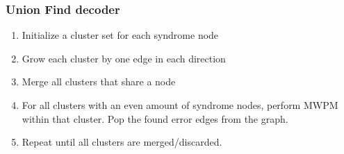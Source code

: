 \subsubsection{Union Find decoder}
\begin{enumerate}
    \item Initialize a cluster set for each syndrome node
    \item Grow each cluster by one edge in each direction
    \item Merge all clusters that share a node
    \item For all clusters with an even amount of syndrome nodes,
    perform MWPM within that cluster. Pop the found error edges from
    the graph.
    \item Repeat until all clusters are merged/discarded.
\end{enumerate}